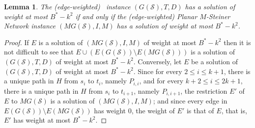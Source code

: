 \documentclass[a4paper,11pt]{article}
\theoremstyle{plain}
\newtheorem{lemma}[theorem]{Lemma}
\newtheorem{identification rule}{Identification Rule}
\theoremstyle{definition}
\theoremstyle{remark}
\begin{document}
\begin{lemma}
The (edge-weighted) \biclique\ instance $(G(\mathcal{S}),T,D)$ has a solution of weight at most $B^*-k^2$ if and only if the (edge-weighted) {\sc Planar $M$-Steiner Network} instance $(MG(\mathcal{S}),I,M)$ has a solution of weight at most $B^*-k^2$.
\end{lemma}

\begin{proof}
If $E$ is a solution of $(MG(\mathcal{S}),I,M)$ of weight at most $B^*-k^2$ then it is not difficult to see that $E \cup (E(G(\mathcal{S})) \setminus E(MG(\mathcal{S})))$ is a solution of $(G(\mathcal{S}),T,D)$ of weight at most $B^*-k^2$. Conversely, let $E$ be a solution of $(G(\mathcal{S}),T,D)$ of weight at most $B^*-k^2$. Since for every $2 \leq i \leq k+1$, there is a unique path in $H$ from $s_i$ to $t_i$, namely $P_{i,i}$, and for every $k+2 \leq i \leq 2k+1$, there is a unique path in $H$ from $s_i$ to $t_{i+1}$, namely $P_{i,i+1}$, the restriction $E'$ of $E$ to $MG(\mathcal{S})$ is a solution of $(MG(\mathcal{S}),I,M)$; and since every edge in $E(G(\mathcal{S})) \setminus E(MG(\mathcal{S}))$ has weight 0, the weight of $E'$ is that of $E$, that is, $E'$ has weight at most $B^*-k^2$.
\end{proof}
\end{document}
